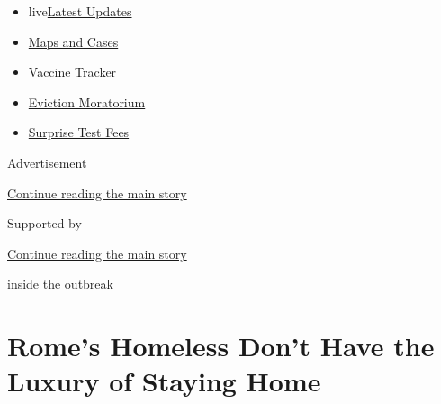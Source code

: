 \begin{itemize}
\tightlist
\item
  live\href{https://www.nytimes3xbfgragh.onion/2020/09/09/world/covid-coronavirus.html?name=styln-coronavirus-national\&region=TOP_BANNER\&block=storyline_menu_recirc\&action=click\&pgtype=Article\&impression_id=c37b67c1-f2d2-11ea-b68a-41a1aa20deb5\&variant=undefined}{Latest
  Updates}
\item
  \href{https://www.nytimes3xbfgragh.onion/interactive/2020/us/coronavirus-us-cases.html?name=styln-coronavirus-national\&region=TOP_BANNER\&block=storyline_menu_recirc\&action=click\&pgtype=Article\&impression_id=c37b67c2-f2d2-11ea-b68a-41a1aa20deb5\&variant=undefined}{Maps
  and Cases}
\item
  \href{https://www.nytimes3xbfgragh.onion/interactive/2020/science/coronavirus-vaccine-tracker.html?name=styln-coronavirus-national\&region=TOP_BANNER\&block=storyline_menu_recirc\&action=click\&pgtype=Article\&impression_id=c37b67c3-f2d2-11ea-b68a-41a1aa20deb5\&variant=undefined}{Vaccine
  Tracker}
\item
  \href{https://www.nytimes3xbfgragh.onion/2020/09/02/your-money/eviction-moratorium-covid.html?name=styln-coronavirus-national\&region=TOP_BANNER\&block=storyline_menu_recirc\&action=click\&pgtype=Article\&impression_id=c37b67c4-f2d2-11ea-b68a-41a1aa20deb5\&variant=undefined}{Eviction
  Moratorium}
\item
  \href{https://www.nytimes3xbfgragh.onion/2020/09/09/upshot/coronavirus-surprise-test-fees.html?name=styln-coronavirus-national\&region=TOP_BANNER\&block=storyline_menu_recirc\&action=click\&pgtype=Article\&impression_id=c37b67c5-f2d2-11ea-b68a-41a1aa20deb5\&variant=undefined}{Surprise
  Test Fees}
\end{itemize}

Advertisement

\protect\hyperlink{after-top}{Continue reading the main story}

Supported by

\protect\hyperlink{after-sponsor}{Continue reading the main story}

inside the outbreak

\hypertarget{romes-homeless-dont-have-the-luxury-of-staying-home}{%
\section{Rome's Homeless Don't Have the Luxury of Staying
Home}\label{romes-homeless-dont-have-the-luxury-of-staying-home}}

